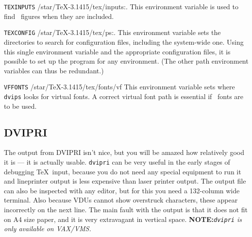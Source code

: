 \begin{list}
\item [\tt TEXINPUTS]{/star/TeX-3.1415/tex/inputs:.}
  This environment variable is used to find \PS\ figures when they
are included.

\item [\tt TEXCONFIG]{/star/TeX-3.1415/tex/ps:.}
  This environment variable sets the directories to search for configuration
files, including the system-wide one.  Using this single environment variable
and the appropriate configuration files, it is possible to set up the program
for any environment.  (The other path environment variables can thus be
redundant.)

\item [\tt  VFFONTS]{/star/TeX-3.1415/tex/fonts/vf}
  This environment variable sets where {\tt dvips} looks for virtual fonts.
A correct virtual font path is essential if \PS\ fonts are to be
used.
\end{list}


\subsection{DVIPRI}
\label{se:dvipri}

The output from DVIPRI isn't nice, but you will be
amazed how relatively good it is --- it is actually usable. \verb+dvipri+ can be very
useful in the early stages of debugging \TeX\ input, because you do not need
any special equipment to run it and lineprinter output is less expensive than
laser printer output. The output file can also be inspected with any editor,
but for this you need a 132-column wide terminal. Also because VDUs cannot show
overstruck characters, these appear incorrectly on the next line. The main
fault with the output is that it does not fit on A4 size paper, and it is very
extravagant in vertical space.  {\bf NOTE:}{\em \verb+dvipri+ is only available
on VAX/VMS.}

